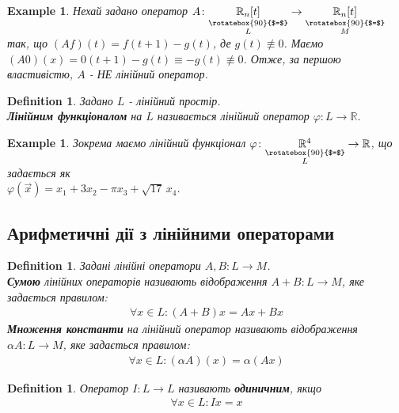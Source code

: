 \documentclass[a4paper, 10pt]{article}
\theoremstyle{theoremdd}
\newtheorem{definition}[theorem]{Definition}
\newtheorem{example}[theorem]{Example}
\begin{document}
	\begin{example}
	Нехай задано оператор $A \colon \underset{\substack{\rotatebox{90}{$=$} \\ L}}{\mathbb{R}_n[t]} \to \underset{\substack{\rotatebox{90}{$=$} \\ M}}{\mathbb{R}_n[t]}$ так, що \quad $(Af)(t) = f(t+1) - g(t)$, де $g(t) \not\equiv 0$. Маємо $(A0)(x) = 0(t+1) - g(t) \equiv -g(t) \not\equiv 0$. Отже, за першою властивістю, $A$ - НЕ лінійний оператор.
	\end{example}
	
	\begin{definition}
	Задано $L$ - лінійний простір.\\
	\textbf{Лінійним функціоналом} на $L$ називається лінійний оператор $\varphi \colon L \to \mathbb{R}$.
	\end{definition}
	
	\begin{example}
	Зокрема маємо лінійний функціонал $\varphi \colon \underset{\substack{\rotatebox{90}{$=$} \\ L}}{\mathbb{R}^4} \to \mathbb{R}$, що задається як \\ $\varphi(\vec{x}) = x_1 + 3x_2 - \pi x_3 + \sqrt{17}\,x_4$.
	\end{example}
	
	\subsection{Арифметичні дії з лінійними операторами}
	\begin{definition}
	Задані лінійні оператори $A,B \colon L \to M$.\\
	\textbf{Сумою} лінійних операторів називають відображення $A+B \colon L \to M$, яке задається правилом:
	\begin{align*}
	\forall x \in L: (A+B)x = Ax+Bx
	\end{align*}
	\textbf{Множення константи} на лінійний оператор називають відображення $\alpha A \colon L \to M$, яке задається правилом:
	\begin{align*}
	\forall x \in L: (\alpha A)(x) = \alpha (Ax)
	\end{align*}
	\end{definition}
	
	\begin{definition}
	Оператор $I \colon L \to L$ називають \textbf{одиничним}, якщо
	\begin{align*}
	\forall x \in L: Ix = x
	\end{align*}
	\end{definition}
	
\end{document}

